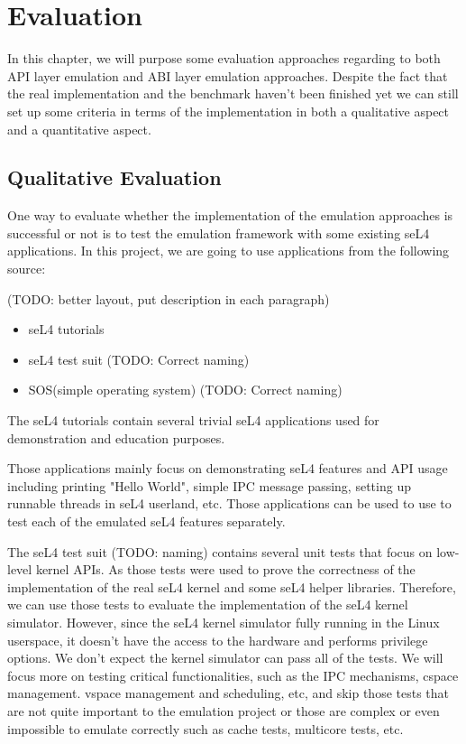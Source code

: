 \chapter{Evaluation}\label{ch:eval}

In this chapter, we will purpose some evaluation approaches regarding to both API layer emulation and ABI layer emulation approaches. Despite the fact that the real implementation and the benchmark haven't been finished yet we can still set up some criteria in terms of the implementation in both a qualitative aspect and a quantitative aspect. 

\section{Qualitative Evaluation} 

One way to evaluate whether the implementation of the emulation approaches is successful or not is to test the emulation framework with some existing seL4 applications. In this project, we are going to use applications from the following source:

(TODO: better layout, put description in each paragraph)

\begin{itemize}
    \item seL4 tutorials
    \item seL4 test suit (TODO: Correct naming)
    \item SOS(simple operating system) (TODO: Correct naming)
\end{itemize}

The seL4 tutorials contain several trivial seL4 applications used for demonstration and education purposes.

Those applications mainly focus on demonstrating seL4 features and API usage including printing "Hello World", simple IPC message passing, setting up runnable threads in seL4 userland, etc. Those applications can be used to use to test each of the emulated seL4 features separately.

The seL4 test suit (TODO: naming) contains several unit tests that focus on low-level kernel APIs. As those tests were used to prove the correctness of the implementation of the real seL4 kernel and some seL4 helper libraries. Therefore, we can use those tests to evaluate the implementation of the seL4 kernel simulator. However, since the seL4 kernel simulator fully running in the Linux userspace, it doesn't have the access to the hardware and performs privilege options. We don't expect the kernel simulator can pass all of the tests. We will focus more on testing critical functionalities, such as the IPC mechanisms, cspace management. vspace management and scheduling, etc, and skip those tests that are not quite important to the emulation project or those are complex or even impossible to emulate correctly such as cache tests, multicore tests, etc.

